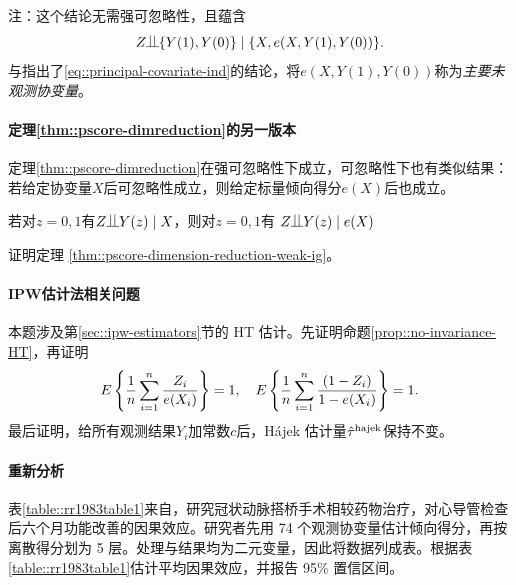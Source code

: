  注：这个结论无需强可忽略性，且蕴含
$$
  Z\ind \{  Y(1), Y(0) \}  \mid  \{ X, e(X, Y(1), Y(0)) \} .
 $$
\citet{rosenbaum2020modern}与\citet{rosenbaum2023propensity}指出了\eqref{eq::principal-covariate-ind}的结论，将$e(X, Y(1), Y(0)   ) $称为{\it 主要未观测协变量}。 
 
 
 
\paragraph{定理\ref{thm::pscore-dimreduction}的另一版本} 

定理\ref{thm::pscore-dimreduction}在强可忽略性下成立，可忽略性下也有类似结果：若给定协变量$X$后可忽略性成立，则给定标量倾向得分$e(X)$后也成立。 

\begin{theorem}
\label{thm::pscore-dimension-reduction-weak-ig}
若对$z=0,1$有$Z\ind Y(z)  \mid X$，则对$z=0,1$有
$
Z\ind Y(z)\mid e(X)
$ 
\end{theorem} 


证明定理 \ref{thm::pscore-dimension-reduction-weak-ig}。



 
 \paragraph{IPW估计法相关问题}
\label{hw::hajek-weights} 
 
本题涉及第\ref{sec::ipw-estimators}节的 HT 估计。先证明命题\ref{prop::no-invariance-HT}，再证明
\begin{eqnarray*} 
E\left\{ \frac{1}{n} \sum_{i=1}^n \frac{Z_i }{e(X_i) } \right\} =1,\quad
E\left\{  \frac{1}{n} \sum_{i=1}^n \frac{ (1-Z_i) }{ 1 - e(X_i) }  \right\} = 1.
\end{eqnarray*}
最后证明，给所有观测结果$Y_i$加常数$c$后，Hájek 估计量$
\hat{\tau}^\textup{hajek} 
$保持不变。 


\paragraph{重新分析\citet{Rosenbaum::1983JRSSB}}



表\ref{table::rr1983table1}来自\citet{Rosenbaum::1983JRSSB}，研究冠状动脉搭桥手术相较药物治疗，对心导管检查后六个月功能改善的因果效应。研究者先用 74 个观测协变量估计倾向得分，再按离散得分划为 5 层。处理与结果均为二元变量，因此将数据列成表。根据表\ref{table::rr1983table1}估计平均因果效应，并报告 95\% 置信区间。 



